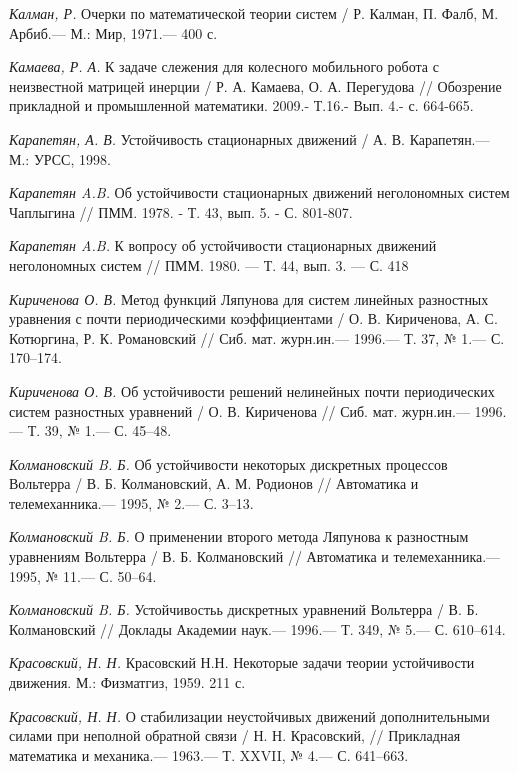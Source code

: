 \begin{thebibliography}{10}
	{\it Калман, Р.} Очерки по математической теории систем / Р. Калман, П. Фалб, М. Арбиб.—
	М.: Мир, 1971.— 400 с.
	
	
	{\it Камаева, Р. А.} К задаче слежения для колесного мобильного робота с неизвестной матрицей инерции / Р. А. Камаева, О. А. Перегудова // Обозрение прикладной и промышленной математики. 2009.- Т.16.- Вып. 4.- с. 664-665.
	
	{\it Карапетян, А. В.} Устойчивость стационарных движений / А. В. Карапетян.—
	М.: УРСС, 1998.
	
	{\it Карапетян A.B.} Об устойчивости стационарных движений неголономных систем Чаплыгина // ПММ. 1978. - Т. 43, вып. 5. - С. 801-807.
	
	{\it Карапетян A.B.} К вопросу об устойчивости стационарных движений неголономных систем // ПММ. 1980. — Т. 44, вып. 3. — С. 418
	
	{\it Кириченова О. В.} Метод функций Ляпунова для систем линейных разностных уравнения с почти периодическими коэффициентами / О. В. Кириченова, А. С. Котюргина, Р. К. Романовский //
	Сиб. мат. журн.ин.— 1996.— Т. 37, № 1.— С. 170–174.
	
	{\it Кириченова О. В.} Об устойчивости решений нелинейных почти периодических систем разностных уравнений / О. В. Кириченова // Сиб. мат. журн.ин.— 1996.— Т. 39, № 1.— С. 45–48.
	
	{\it Колмановский B. Б.} Об устойчивости некоторых дискретных процессов Вольтерра / В. Б. Колмановский, А. М. Родионов // Автоматика и телемеханника.— 1995, № 2.— С. 3–13.
	
	{\it Колмановский B. Б.} О применении второго метода Ляпунова к разностным уравнениям Вольтерра / В. Б. Колмановский // Автоматика и телемеханника.— 1995, № 11.— С. 50–64.
	
	{\it Колмановский B. Б.} Устойчивостьь дискретных уравнений Вольтерра / В. Б. Колмановский // Доклады Академии наук.— 1996.— Т. 349, № 5.— С. 610–614.
	
	{\it Красовский, Н. Н.} Красовский Н.Н. Некоторые задачи теории устойчивости движения. М.:
	Физматгиз, 1959. 211 с.
	
	{\it Красовский, Н. Н.} О стабилизации неустойчивых движений дополнительными силами при неполной обратной связи / Н. Н. Красовский,
	// Прикладная математика и механика.— 1963.— Т. XXVII, № 4.— С. 641–663.
	

\end{thebibliography}
